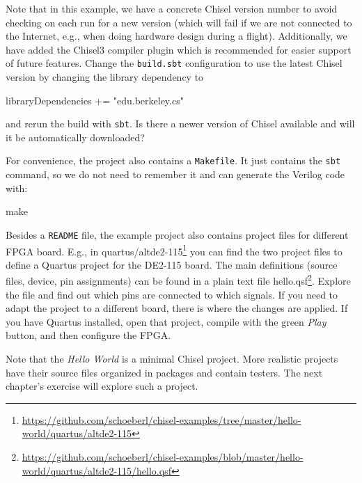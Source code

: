 \documentclass[%
    10pt,
    headinclude, footexclude,
    openright, %
    notitlepage,
    cleardoubleempty,
    headsepline,
    pointlessnumbers,
    bibtotoc, idxtotoc,
    ]{scrbook}
\newcommand{\code}[1]{{\small{\texttt{#1}}}}
\newcommand{\myref}[2]{\href{#1}{#2}}
\renewcommand{\myref}[2]{{#2}{\footnote{\url{#1}}}}
\begin{document}
\noindent Note that in this example, we have a concrete Chisel version number to avoid checking on
each run for a new version (which will fail if we are not connected to the Internet,
e.g., when doing hardware design during a flight). Additionally, we have added the Chisel3 compiler
plugin which is recommended for easier support of future features.
Change the \code{build.sbt} configuration to use the latest Chisel version by changing the
library dependency to

\begin{chisel}
libraryDependencies += "edu.berkeley.cs" %
\end{chisel}

\noindent and rerun the build with \code{sbt}. Is there a newer version of Chisel
available and will it be automatically downloaded?

For convenience, the project also contains a \code{Makefile}.
It just contains the \code{sbt} command, so we do not need to remember it and
can generate the Verilog code with:

\begin{chisel}
make
\end{chisel}

Besides a \code{README} file, the example project also contains project
files for different FPGA board. E.g., in
\myref{https://github.com/schoeberl/chisel-examples/tree/master/hello-world/quartus/altde2-115}{quartus/altde2-115} 
you can find the two project files to define a Quartus project for the DE2-115 board.
The main definitions (source files, device, pin assignments) can be found in a plain text file
\myref{https://github.com/schoeberl/chisel-examples/blob/master/hello-world/quartus/altde2-115/hello.qsf}{hello.qsf}.
Explore the file and find out which pins are connected to which signals.
If you need to adapt the project to a different board, there is where the changes are applied.
If you have Quartus installed, open that project, compile with the green \emph{Play} button,
and then configure the FPGA.

Note that the \emph{Hello World} is a minimal Chisel project.
More realistic projects have their source files organized in packages and contain testers.
The next chapter's exercise will explore such a project.
\end{document}
